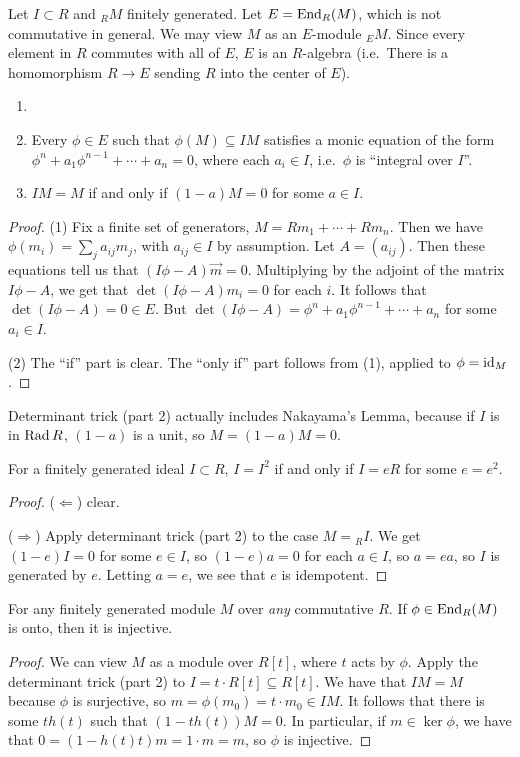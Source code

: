  Let $I\subset R$ and ${}_R M$ finitely generated. Let
 $E=\operatorname{End}_R (M)$, which is not commutative in general. We may view $M$ as an $E$-module
 ${}_E M$. Since every element in $R$ commutes with all of $E$, $E$ is an $R$-algebra (i.e.\
 There is a homomorphism $R\to E$ sending $R$ into the center of $E$).
 \begin{lemma}
  \begin{enumerate}\item[]
    \item Every $\phi\in E$ such that $\phi(M)\subseteq IM$ satisfies a monic equation
    of the form $\phi^n+a_1\phi^{n-1} +\cdots + a_n=0$, where each $a_i\in I$, i.e.\
    $\phi$ is ``integral over $I$''.

    \item $IM=M$ if and only if $(1-a)M=0$ for some $a\in I$.
  \end{enumerate}
 \end{lemma}
 \begin{proof}
   (1) Fix a finite set of generators, $M=Rm_1+\cdots + Rm_n$. Then we have
   $\phi(m_i)=\sum_j a_{ij} m_j$, with $a_{ij}\in I$ by assumption. Let $A=(a_{ij})$.
   Then these equations tell us that $(I\phi-A)\vec{m}=0$. Multiplying by the adjoint of
   the matrix $I\phi-A$, we get that $\det(I\phi-A)m_i=0$ for each $i$. It follows that
   $\det(I\phi-A)=0\in E$. But $\det(I\phi-A)=\phi^n+a_1\phi^{n-1}+\cdots +a_n$ for some
   $a_i\in I$.

   (2) The ``if'' part is clear. The ``only if'' part follows from (1), applied to
   $\phi=\operatorname{id}_M$.
 \end{proof}
 \begin{remark}
   Determinant trick (part 2) actually includes Nakayama's Lemma, because if $I$ is in
   $\operatorname{Rad} R$, $(1-a)$ is a unit, so $M=(1-a)M=0$.
 \end{remark}
 \begin{corollary}
   For a finitely generated ideal $I\subset R$, $I=I^2$ if and only if $I=eR$ for some
   $e=e^2$.
 \end{corollary}
 \begin{proof}
   ($\Leftarrow$) clear.

   ($\Rightarrow$) Apply determinant trick (part 2) to the case $M={}_R I$. We get
   $(1-e)I=0$ for some $e\in I$, so $(1-e)a=0$ for each $a\in I$, so $a=ea$, so $I$ is
   generated by $e$. Letting $a=e$, we see that $e$ is idempotent.
 \end{proof}
 \begin{corollary}
   For any finitely generated module $M$ over \emph{any} commutative $R$. If $\phi\in
   \operatorname{End}_R(M)$ is onto, then it is injective.
 \end{corollary}
 \begin{proof}
   We can view $M$ as a module over $R[t]$, where $t$ acts by $\phi$. Apply the
   determinant trick (part 2) to $I=t\cdot R[t]\subseteq R[t]$. We have that $IM=M$
   because $\phi$ is surjective, so $m =\phi(m_0)=t\cdot m_0\in IM$. It follows that
   there is some $th(t)$ such that $(1-th(t))M=0$. In particular, if $m\in  \ker \phi$,
   we have that $0=(1-h(t)t)m=1\cdot m=m$, so $\phi$ is injective.
 \end{proof}

